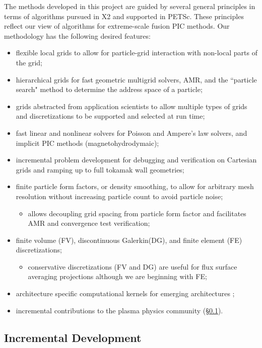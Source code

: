 \documentclass[review]{siamart}
\begin{document}
The methods developed in this project are guided by several general principles in terms of algorithms pursued in X2 and supported in PETSc.
These principles reflect our view of algorithms for extreme-scale fusion PIC methods.
Our methodology has the following desired features:
\begin{itemize}
\item flexible local grids to allow for particle-grid interaction with non-local parts of the grid;
\item hierarchical grids for fast geometric multigrid solvers, AMR, and the ``particle search" method to determine the address space of a particle;
\item grids abstracted from application scientists to allow multiple types of grids and discretizations to be supported and selected at run time;
\item fast linear and nonlinear solvers for Poisson and Ampere's law solvers, and implicit PIC methods (magnetohydrodymaic);
\item incremental problem development for debugging and verification on Cartesian grids and ramping up to full tokamak wall geometries;
\item finite particle form factors, or density smoothing, to allow for arbitrary mesh resolution without increasing particle count to avoid particle noise;
\begin{itemize}
\item allows decoupling grid spacing from particle form factor and facilitates AMR and convergence test verification;
\end{itemize}
\item finite volume (FV), discontinuous Galerkin(DG), and finite element (FE) discretizations;
\begin{itemize}
\item conservative discretizations (FV and DG) are useful for flux surface averaging projections although we are beginning with FE;
\end{itemize}
\item architecture specific computational kernels for emerging architectures \cite{KnepleyBrownMcInnesSmithRuppAdams2015};
\item incremental contributions to the plasma physics community (\S\ref{sec:id}).
\end{itemize}

\subsection{Incremental Development}
\label{sec:id}
\end{document}
